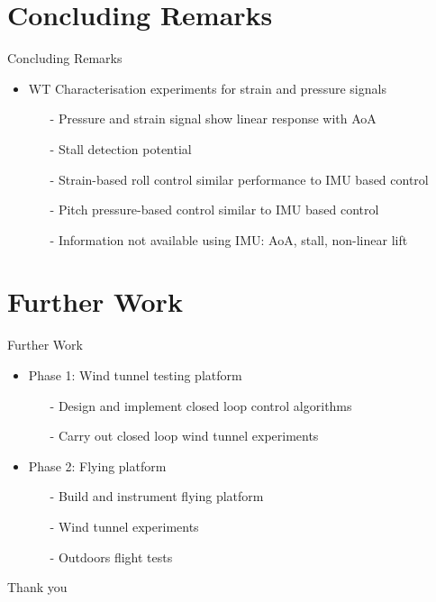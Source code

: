 \documentclass[aspectratio=169]{beamer}            %
\begin{document}
\section{Concluding Remarks}
\begin{frame}{Concluding Remarks}

  \pause
  \begin{itemize}[<+->]
    \item WT Characterisation experiments for strain and pressure signals
		  \begin{itemize}[<+->]
			  \item[-]{Pressure and strain signal show linear response with AoA}
        \item[-]{Stall detection potential}
				\item[-]{Strain-based roll control similar performance to IMU based control}
        \item[-]{Pitch pressure-based control similar to IMU based control}
			  \item[-]{Information not available using IMU: AoA, stall, non-linear lift}
			\end{itemize}
  \end{itemize}
	  
\end{frame}

\section{Further Work}
\begin{frame}{Further Work}

  \pause
  \begin{itemize}[<+->]
    \item Phase 1: Wind tunnel testing platform
      \begin{itemize}[<+->]
      \item[-]Design and implement closed loop control algorithms
      \item[-]Carry out closed loop wind tunnel experiments
      \end{itemize}
	
    \item Phase 2: Flying platform
      \begin{itemize}[<+->]
			\item[-]Build and instrument flying platform
      \item[-]Wind tunnel experiments
      \item[-]Outdoors flight tests
      \end{itemize}
  \end{itemize}
	
\end{frame}

\begin{frame}{}

  \centering
	\Huge{Thank you}

\end{frame}

\end{document}
